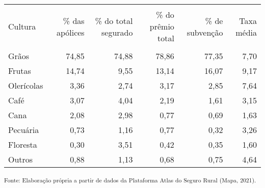 \footnotesize
\vspace{0.05cm}
\begin{tabularx}{\textwidth}{lRRRRR}
    \hline \\[-1.9ex]	 
    Cultura    & \% das apólices & \% do total segurado & \% do prêmio total & \% de subvenção & Taxa média \\
    \hline \\[-1.9ex]	 
    Grãos      & 74,85           & 74,88                & 78,86              & 77,35           & 7,70       \\
    Frutas     & 14,74           & 9,55                 & 13,14              & 16,07           & 9,17       \\
    Olerícolas & 3,36            & 2,74                 & 3,17               & 2,85            & 7,64       \\
    Café       & 3,07            & 4,04                 & 2,19               & 1,61            & 3,15       \\
    Cana       & 2,08            & 2,98                 & 0,77               & 0,69            & 1,63       \\
    Pecuária   & 0,73            & 1,16                 & 0,77               & 0,32            & 3,26       \\
    Floresta   & 0,30            & 3,51                 & 0,42               & 0,35            & 1,60       \\
    Outros     & 0,88            & 1,13                 & 0,68               & 0,75            & 4,64       \\ 
    \hline 
\end{tabularx}
\small \textsuperscript{Fonte: Elaboração própria a partir de dados da Plataforma Atlas do Seguro Rural (Mapa, 2021).  }\\